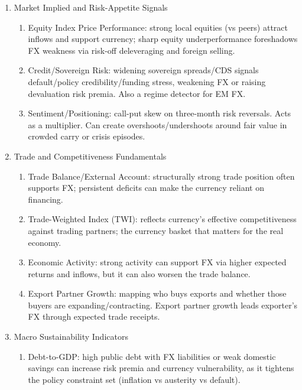 \documentclass[a4paper,oneside,openany]{book}
\begin{document}
\begin{remark} 
\begin{enumerate}[label=\roman*.]
\setlength{\itemsep}{0pt}
\item Market Implied and Risk-Appetite Signals
\begin{enumerate}[label=\arabic*.]
\setlength{\itemsep}{0pt}
\item Equity Index Price Performance: strong local equities (vs peers) attract inflows and support currency; sharp equity underperformance foreshadows FX weakness via risk-off deleveraging and foreign selling.
\item Credit/Sovereign Risk: widening sovereign spreads/CDS signals default/policy credibility/funding stress, weakening FX or raising devaluation risk premia. Also a regime detector for EM FX.
\item Sentiment/Positioning: call-put skew on three-month risk reversals. Acts as a multiplier. Can create overshoots/undershoots around fair value in crowded carry or crisis episodes.
\end{enumerate}
\item Trade and Competitiveness Fundamentals
\begin{enumerate}[label=\arabic*.]
\setlength{\itemsep}{0pt}
\item Trade Balance/External Account: structurally strong trade position often supports FX; persistent deficits can make the currency reliant on financing.
\item Trade-Weighted Index (TWI): reflects currency's effective competitiveness against trading partners; the currency basket that matters for the real economy.
\item Economic Activity: strong activity can support FX via higher expected returns and inflows, but it can also worsen the trade balance.
\item Export Partner Growth: mapping who buys exports and whether those buyers are expanding/contracting. Export partner growth leads exporter's FX through expected trade receipts.
\end{enumerate}
\item Macro Sustainability Indicators
\begin{enumerate}[label=\arabic*.]
\setlength{\itemsep}{0pt}
\item Debt-to-GDP: high public debt with FX liabilities or weak domestic savings can increase risk premia and currency vulnerability, as it tightens the policy constraint set (inflation vs austerity vs default).

\end{enumerate}
\end{enumerate}
\end{remark}
\end{document}
